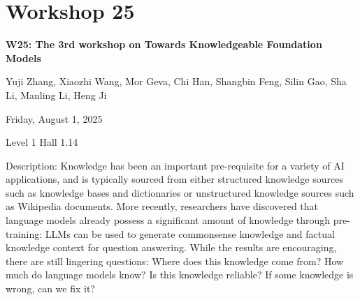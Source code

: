 \clearpage


\section[W25: The 3rd workshop on Towards Knowledgeable Foundation Models]{Workshop 25}

\begin{center}
    {\Large \textbf{W25: The 3rd workshop on Towards Knowledgeable Foundation Models}}

Yuji Zhang, Xiaozhi Wang, Mor Geva, Chi Han, Shangbin Feng, Silin Gao, Sha Li, Manling Li, Heng Ji

    Friday, August 1, 2025

 Level 1 Hall 1.14
    
\end{center}

Description: Knowledge has been an important pre-requisite for a variety of AI applications, and is typically sourced from either structured knowledge sources such as knowledge bases and dictionaries or unstructured knowledge sources such as Wikipedia documents. More recently, researchers have discovered that language models already possess a significant amount of knowledge through pre-training: LLMs can be used to generate commonsense knowledge and factual knowledge context for question answering. While the results are encouraging, there are still lingering questions: Where does this knowledge come from? How much do language models know? Is this knowledge reliable? If some knowledge is wrong, can we fix it?

